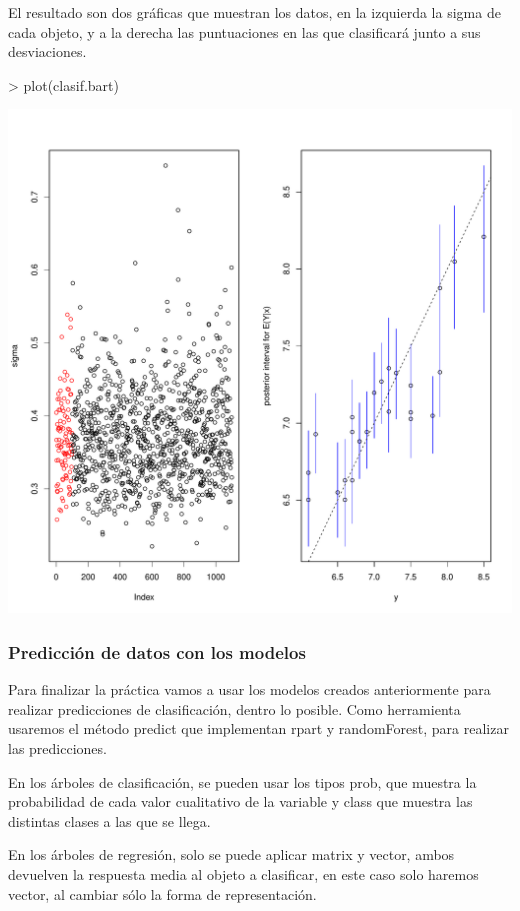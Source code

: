 \documentclass[a4paper]{article}
\begin{document}
El resultado son dos gráficas que muestran los datos, en la izquierda la sigma de cada objeto, y a la derecha las puntuaciones en las que clasificará junto a sus desviaciones.

\begin{Schunk}
\begin{Sinput}
> plot(clasif.bart)
\end{Sinput}
\end{Schunk}
\includegraphics{practica-3-bart}

\subsubsection{Predicción de datos con los modelos}
Para finalizar la práctica vamos a usar los modelos creados anteriormente para realizar predicciones de clasificación, dentro lo posible. Como herramienta usaremos el método predict que implementan rpart y randomForest, para realizar las predicciones.

En los árboles de clasificación, se pueden usar los tipos prob, que muestra la probabilidad de cada valor cualitativo de la variable y class que muestra las distintas clases a las que se llega.

En los árboles de regresión, solo se puede aplicar matrix y vector, ambos devuelven la respuesta media al objeto a clasificar, en este caso solo haremos vector, al cambiar sólo la forma de representación.
\end{document}
